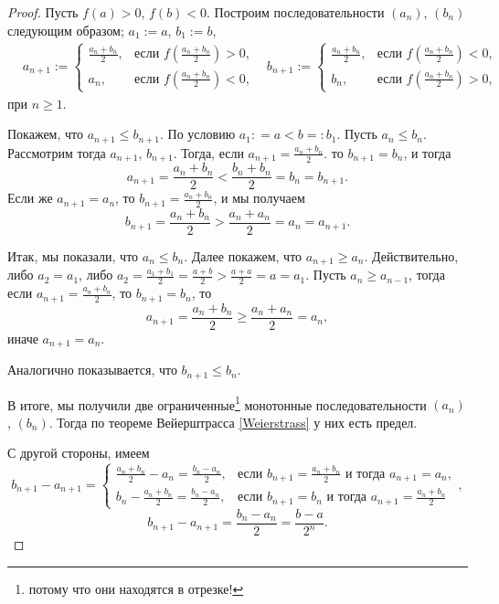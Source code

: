\begin{proof}
    Пусть $f(a)>0$, $f(b)<0$.  Построим последовательности $(a_n)$, $(b_n)$ следующим образом; $a_1:=a$, $b_1:=b$,
\begin{align*}
    &a_{n+1}:= \begin{cases}
        \frac{a_n +b_n}{2}, & \mbox{если $f(\frac{a_n +b_n}{2})>0$},\\
        a_n, & \mbox{если $f(\frac{a_n +b_n}{2})<0$},
    \end{cases}  & b_{n+1}:= \begin{cases}
        \frac{a_n +b_n}{2}, & \mbox{если $f(\frac{a_n +b_n}{2})<0$},\\
        b_n, & \mbox{если $f(\frac{a_n +b_n}{2})>0$},
        \end{cases}
\end{align*}
при $n\ge 1$.

Покажем, что $a_{n+1}\le b_{n+1}$. По условию $a_1: = a < b =:b_1$. Пусть $a_n \le b_n$. Рассмотрим тогда $a_{n+1}$, $b_{n+1}$. Тогда, если $a_{n+1} = \frac{a_{n}+b_n}{2}$. то $b_{n+1} = b_n$, и тогда 
\[
 a_{n+1} = \frac{a_n+b_n}{2} < \frac{b_n + b_n}{2} = b_n = b_{n+1}.
\]
Если же $a_{n+1} = a_n$, то $b_{n+1} = \frac{a_n + b_n}{2}$, и мы получаем
\[
 b_{n+1} = \frac{a_n + b_n}{2} > \frac{a_n + a_n}{2} = a_n = a_{n+1}.
\]

Итак, мы показали, что $a_n \le b_n$. Далее покажем, что $a_{n+1} \ge a_n$. Действительно, либо $a_2= a_1$, либо $a_2 = \frac{a_1 + b_1}{2} = \frac{a+b}{2} > \frac{a+a}{2} = a = a_1$. Пусть $a_{n} \ge a_{n-1}$, тогда если $a_{n+1} = \frac{a_n + b_n}{2}$, то $b_{n+1} = b_n$, то
\[
 a_{n+1} = \frac{a_n + b_n}{2} \ge \frac{a_n + a_n}{2} = a_n,
\]
иначе $a_{n+1} = a_n$.

Аналогично показывается, что $b_{n+1} \le b_{n}$.

В итоге, мы получили две ограниченные\footnote{потому что они находятся в отрезке!} монотонные последовательности $(a_n)$, $(b_n)$. Тогда по теореме Вейерштрасса \ref{Weierstrass} у них есть предел.

С другой стороны, имеем
\[
 b_{n+1} - a_{n+1} = \begin{cases}
      \frac{a_n+b_n}{2} - a_n = \frac{b_n - a_n}{2}, & \mbox{если $b_{n+1} = \frac{a_n + b_n}{2}$ и тогда $a_{n+1} = a_n$}, \\
      b_n - \frac{a_n + b_n}{2} = \frac{b_n - a_n}{2}, & \mbox{если $b_{n+1} = b_n$ и тогда $a_{n+1} = \frac{a_n + b_n}{2}$}
 \end{cases}, 
\]
\ie
\[
 b_{n+1} - a_{n+1} = \frac{b_n - a_n}{2} =  \frac{b - a}{2^{n}}.
\]
\end{proof}

